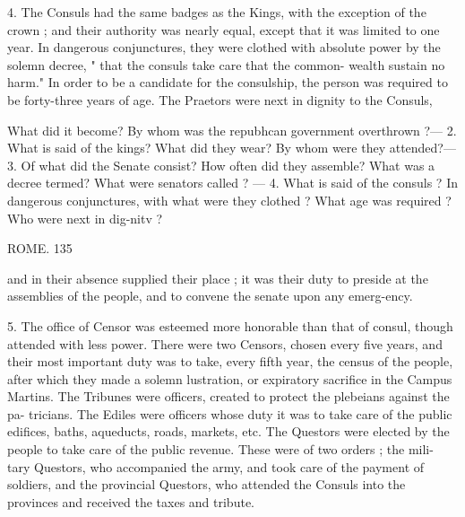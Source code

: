 \documentclass[openany,a4paper]{memoir}
\begin{document}
4. The Consuls had the same badges as the Kings, with 
the exception of the crown ; and their authority was nearly 
equal, except that it was limited to one year. In dangerous 
conjunctures, they were clothed with absolute power by the 
solemn decree, " that the consuls take care that the common- 
wealth sustain no harm." In order to be a candidate for the 
consulship, the person was required to be forty-three years 
of age. The Praetors were next in dignity to the Consuls, 

What did it become? By whom was the repubhcan government 
overthrown ?— 2. What is said of the kings? What did they wear? 
By whom were they attended?— 3. Of what did the Senate consist? 
How often did they assemble? What was a decree termed? What 
were senators called ? — 4. What is said of the consuls ? In dangerous 
conjunctures, with what were they clothed ? What age was required ? 
Who were next in dig-nitv ? 



ROME. 135 

and in their absence supplied their place ; it was their duty 
to preside at the assemblies of the people, and to convene 
the senate upon any emerg-ency. 

5. The office of Censor was esteemed more honorable than 
that of consul, though attended with less power. There 
were two Censors, chosen every five years, and their most 
important duty was to take, every fifth year, the census of 
the people, after which they made a solemn lustration, or 
expiratory sacrifice in the Campus Martins. The Tribunes 
were officers, created to protect the plebeians against the pa- 
tricians. The Ediles were officers whose duty it was to take 
care of the public edifices, baths, aqueducts, roads, markets, 
etc. The Questors were elected by the people to take care 
of the public revenue. These were of two orders ; the mili- 
tary Questors, who accompanied the army, and took care of 
the payment of soldiers, and the provincial Questors, who 
attended the Consuls into the provinces and received the 
taxes and tribute. 
\end{document}
